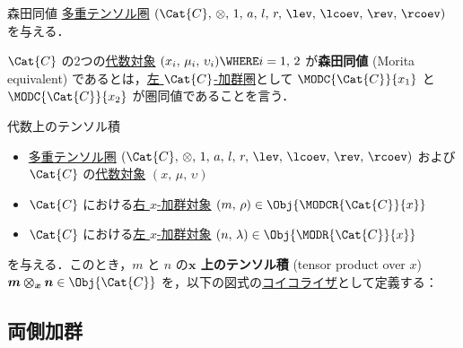 \documentclass[TQFT_main]{subfiles}
\begin{document}
\begin{mydef}[label=def:Morita-equiv]{森田同値}
    \hyperref[def:tensorfusion-cat]{多重テンソル圏} $(\Cat{C},\, \otimes,\, 1,\, a,\, l,\, r,\, \lev,\, \lcoev,\, \rev,\, \rcoev)$ を与える．
    
    $\Cat{C}$ の2つの\hyperref[def:algobj]{代数対象} $(x_i,\, \mu_i,\, \upsilon_i) \WHERE i = 1,\, 2$ が\textbf{森田同値} (Morita equivalent) であるとは，\hyperref[def:modulecat]{左 $\Cat{C}$-加群圏}として $\MODC{\Cat{C}}{x_1}$ と $\MODC{\Cat{C}}{x_2}$ が圏同値であることを言う．
\end{mydef}

\begin{mydef}[label=def:tensor-overalg]{代数上のテンソル積}
    \begin{itemize}
        \item \hyperref[def:tensorfusion-cat]{多重テンソル圏} $(\Cat{C},\, \otimes,\, 1,\, a,\, l,\, r,\, \lev,\, \lcoev,\, \rev,\, \rcoev)$ および $\Cat{C}$ の\hyperref[def:algobj]{代数対象} $(x,\, \mu,\, \upsilon)$
        \item $\Cat{C}$ における\hyperref[def:moduleobj]{右 $x$-加群対象} $(m,\, \rho) \in \Obj{\MODCR{\Cat{C}}{x}}$
        \item $\Cat{C}$ における\hyperref[def:moduleobj]{左 $x$-加群対象} $(n,\, \lambda) \in \Obj{\MODR{\Cat{C}}{x}}$
    \end{itemize}
    を与える．このとき，$m$ と $n$ の\textbf{$\bm{x}$ 上のテンソル積} (tensor product over $x$) $\bm{m \otimes_x n} \in \Obj{\Cat{C}}$ を，以下の図式の\hyperref[def:colim]{コイコライザ}として定義する：
    \begin{center}
    \end{center}
\end{mydef}


\subsection{両側加群}
\end{document}
